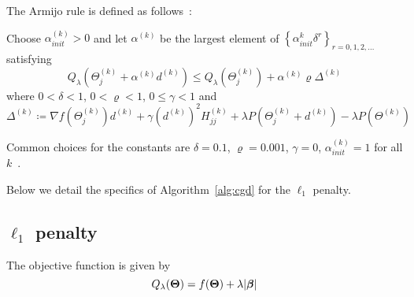 \begin{comment}
We note that conditional on $\widehat{\bbeta}$ and $\widehat{\eta}$, there exists an analytic solution for $\widehat{\sigma^2}$:
\begin{align}
\frac{\partial}{\partial \sigma^2} f(\bTheta) &= \frac{N_T}{2\sigma^2}- \frac{1}{2\sigma^4} \sum_{i=1}^{N_T}\frac{([ \bYtilde - \bXtilde \bbeta]_i )^2}{1 + \eta (\Lambda_i-1)} = 0 \nonumber \\
\widehat{\sigma^2} & = \frac{1}{N_T}\sum_{i=1}^{N_T}\frac{([ \bYtilde - \bXtilde \widehat{\bbeta}]_i )^2}{1 + \widehat{\eta} (\Lambda_i-1)} \label{eq:sigmahat}
\end{align}
\end{comment}

The Armijo rule is defined as follows~\citep{tseng2009coordinate}:
\begin{tcolorbox}
	Choose $\alpha_{init}^{(k)}>0$ and let $\alpha^{(k)}$ be the largest element of $\left\lbrace \alpha_{init}^k \delta^r \right\rbrace_{r = 0,1,2,\ldots} $ satisfying
	\begin{equation}
	Q_{\lambda}(\Theta_j^{(k)} + \alpha^{(k)} d^{(k)}) \leq Q_{\lambda} (\Theta_j^{(k)}) + \alpha^{(k)}\varrho \Delta^{(k)}
	\end{equation}
	where $0 < \delta <1$, $0 < \varrho <1$, $0 \leq \gamma < 1$ and
	\begin{equation}
	\Delta^{(k)} \coloneqq \nabla f(\Theta_j^{(k)})d^{(k)} + \gamma (d^{(k)})^2 H^{(k)}_{jj} + \lambda P(\Theta_j^{(k)} + d^{(k)}) - \lambda P(\Theta^{(k)})
	\end{equation}
\end{tcolorbox}
Common choices for the constants are $\delta=0.1$, $\varrho=0.001$, $\gamma = 0$, $\alpha_{init}^{(k)} = 1$ for all $k$~\citep{schelldorfer2011estimation}.

Below we detail the specifics of Algorithm~\ref{alg:cgd} for the $\ell_1$ penalty.

\subsection{$\ell_1$ penalty}\label{subsec:l1penalty}

The objective function is given by
\begin{equation}
Q_{\lambda}(\boldsymbol{\Theta}) = f(\boldsymbol{\Theta}) + \lambda |\boldsymbol{\beta}|
\end{equation}


